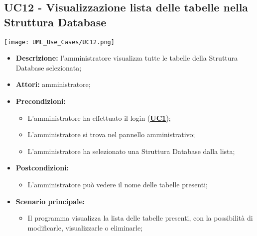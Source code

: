 \subsection{UC12 - Visualizzazione lista delle tabelle nella Struttura Database}
\label{sec:UC12}
\texttt{[image: UML\_Use\_Cases/UC12.png]}
\begin{itemize}
	\item \textbf{Descrizione:} l’amministratore visualizza tutte le tabelle della Struttura Database selezionata;
	\item \textbf{Attori:} amministratore;
	\item \textbf{Precondizioni:} 
	\begin{itemize}
		\item L’amministratore ha effettuato il login (\hyperref[sec:UC1]{\textbf{UC1}});
		\item L’amministratore si trova nel pannello amministrativo;
		\item L'amministratore ha selezionato una Struttura Database dalla lista;
	\end{itemize}
	\item \textbf{Postcondizioni:} 
	\begin{itemize}
		\item L'amministratore può vedere il nome delle tabelle presenti;
	\end{itemize}
	\item \textbf{Scenario principale:} 
	\begin{itemize}
		\item Il programma visualizza la lista delle tabelle presenti, con la possibilità di modificarle, visualizzarle o eliminarle;
	\end{itemize}
\end{itemize}

